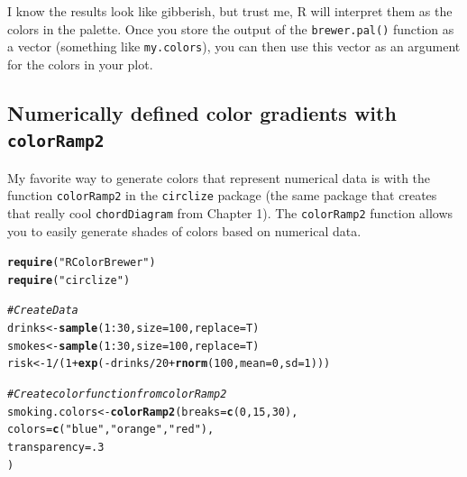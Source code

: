 \documentclass{tufte-book}\usepackage[]{graphicx}\usepackage[]{color}
\makeatletter
\newcommand{\hlnum}[1]{\textcolor[rgb]{0.686,0.059,0.569}{#1}}%
\newcommand{\hlstr}[1]{\textcolor[rgb]{0.192,0.494,0.8}{#1}}%
\newcommand{\hlcom}[1]{\textcolor[rgb]{0.678,0.584,0.686}{\textit{#1}}}%
\newcommand{\hlopt}[1]{\textcolor[rgb]{0,0,0}{#1}}%
\newcommand{\hlstd}[1]{\textcolor[rgb]{0.345,0.345,0.345}{#1}}%
\newcommand{\hlkwb}[1]{\textcolor[rgb]{0.69,0.353,0.396}{#1}}%
\newcommand{\hlkwc}[1]{\textcolor[rgb]{0.333,0.667,0.333}{#1}}%
\newcommand{\hlkwd}[1]{\textcolor[rgb]{0.737,0.353,0.396}{\textbf{#1}}}%
\newenvironment{kframe}{%
 \def\at@end@of@kframe{}%
 \ifinner\ifhmode%
  \def\at@end@of@kframe{\end{minipage}}%
  \begin{minipage}{\columnwidth}%
 \fi\fi%
 \def\FrameCommand##1{\hskip\@totalleftmargin \hskip-\fboxsep
 \colorbox{shadecolor}{##1}\hskip-\fboxsep
     \hskip-\linewidth \hskip-\@totalleftmargin \hskip\columnwidth}%
 \MakeFramed {\advance\hsize-\width
   \@totalleftmargin\z@ \linewidth\hsize
   \@setminipage}}%
 {\par\unskip\endMakeFramed%
 \at@end@of@kframe}
\newenvironment{knitrout}{}{} %
\makeatother
\begin{document}
\begin{footnotesize}
I know the results look like gibberish, but trust me, R will interpret them as the colors in the palette. Once you store the output of the \texttt{brewer.pal()} function as a vector (something like \texttt{my.colors}), you can then use this vector as an argument for the colors in your plot.

\subsection{Numerically defined color gradients with \texttt{colorRamp2}}

My favorite way to generate colors that represent numerical data is with the function \texttt{colorRamp2} in the \texttt{circlize} package (the same package that creates that really cool \texttt{chordDiagram} from Chapter 1). The \texttt{colorRamp2} function allows you to easily generate shades of colors based on numerical data. 

\begin{marginfigure}
\begin{tiny}
\begin{knitrout}
\color{fgcolor}\begin{kframe}
\begin{alltt}
\hlkwd{require}\hlstd{(}\hlstr{"RColorBrewer"}\hlstd{)}
\hlkwd{require}\hlstd{(}\hlstr{"circlize"}\hlstd{)}

\hlcom{# Create Data}
\hlstd{drinks} \hlkwb{<-} \hlkwd{sample}\hlstd{(}\hlnum{1}\hlopt{:}\hlnum{30}\hlstd{,} \hlkwc{size} \hlstd{=} \hlnum{100}\hlstd{,} \hlkwc{replace} \hlstd{= T)}
\hlstd{smokes} \hlkwb{<-} \hlkwd{sample}\hlstd{(}\hlnum{1}\hlopt{:}\hlnum{30}\hlstd{,} \hlkwc{size} \hlstd{=} \hlnum{100}\hlstd{,} \hlkwc{replace} \hlstd{= T)}
\hlstd{risk} \hlkwb{<-} \hlnum{1} \hlopt{/} \hlstd{(}\hlnum{1} \hlopt{+} \hlkwd{exp}\hlstd{(}\hlopt{-}\hlstd{drinks} \hlopt{/} \hlnum{20} \hlopt{+} \hlkwd{rnorm}\hlstd{(}\hlnum{100}\hlstd{,} \hlkwc{mean} \hlstd{=} \hlnum{0}\hlstd{,} \hlkwc{sd} \hlstd{=} \hlnum{1}\hlstd{)))}

\hlcom{# Create color function from colorRamp2}
\hlstd{smoking.colors} \hlkwb{<-} \hlkwd{colorRamp2}\hlstd{(}\hlkwc{breaks} \hlstd{=} \hlkwd{c}\hlstd{(}\hlnum{0}\hlstd{,} \hlnum{15}\hlstd{,} \hlnum{30}\hlstd{),}
                  \hlkwc{colors} \hlstd{=} \hlkwd{c}\hlstd{(}\hlstr{"blue"}\hlstd{,} \hlstr{"orange"}\hlstd{,} \hlstr{"red"}\hlstd{),}
                  \hlkwc{transparency} \hlstd{=} \hlnum{.3}
                  \hlstd{)}


\end{alltt}
\end{kframe}
\end{knitrout}
\end{tiny}
\end{marginfigure}
\end{footnotesize}
\end{document}
